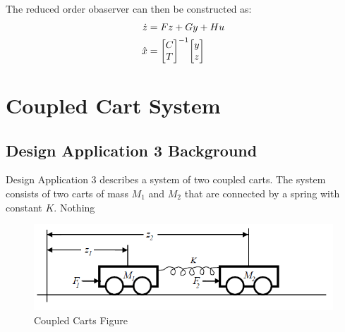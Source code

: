 \documentclass[]{article}
\begin{document}
			The reduced order obaserver can then be constructed as:
			\begin{equation}
				\begin{aligned}
					\dot{z} &= F z + G y + H u\\
					\hat{x}	&= \mqty[C\\T]^{-1} \mqty[y\\z]
				\end{aligned}
			\end{equation}
 			
	 			 		
	 			 		
	 			 		
	 			 		
	 			 		

%	 		
% 		
% 			
%	 		
%	 		
 			
 			
 			
	
	
					
\newpage
\section{Coupled Cart System}
	\subsection{Design Application 3 Background}
		Design Application 3 describes a system of two coupled carts. The system consists of two carts of mass $M_1$ and $M_2$ that are connected by a spring with constant $K$.
		Nothing 
		\begin{figure}[h]
			\centering
			\includegraphics[width=0.7\linewidth]{Fig/DesignApplication3}
			\caption{Coupled Carts Figure}
			\label{fig:designapplication3}
		\end{figure}
		
\end{document}
